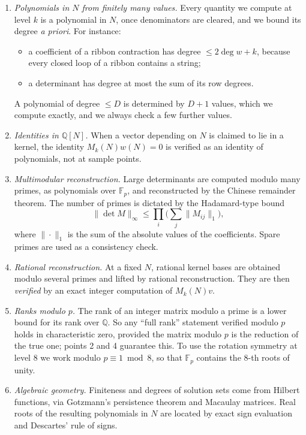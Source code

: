\documentclass[11pt]{amsart}
\theoremstyle{definition}
\theoremstyle{remark}
\theoremstyle{plain}
\numberwithin{equation}{section}
\numberwithin{table}{section}
\newcommand{\Q}{\mathbb Q}
\newcommand{\F}{\mathbb F}
\begin{document}
\begin{enumerate}
\item \emph{Polynomials in $N$ from finitely many values.} Every quantity we compute at level $k$ is a polynomial in $N$, once denominators are cleared, and we bound its degree \emph{a priori}. For instance:
\begin{itemize}
\item a coefficient of a ribbon contraction has degree $\le2\deg w+k$, because every closed loop of a ribbon contains a string;
\item a determinant has degree at most the sum of its row degrees.
\end{itemize}
A polynomial of degree $\le D$ is determined by $D+1$ values, which we compute exactly, and we always check a few further values.
\item \emph{Identities in $\Q[N]$.} When a vector depending on $N$ is claimed to lie in a kernel, the identity $M_k(N)w(N)=0$ is verified as an identity of polynomials, not at sample points.
\item \emph{Multimodular reconstruction.} Large determinants are computed modulo many primes, as polynomials over $\F_p$, and reconstructed by the Chinese remainder theorem. The number of primes is dictated by the Hadamard-type bound
\[
\|\det M\|_\infty\le\prod_i\Big(\sum_j\|M_{ij}\|_1\Big),
\]
where $\|\cdot\|_1$ is the sum of the absolute values of the coefficients. Spare primes are used as a consistency check.
\item \emph{Rational reconstruction.} At a fixed $N$, rational kernel bases are obtained modulo several primes and lifted by rational reconstruction. They are then \emph{verified} by an exact integer computation of $M_k(N)v$.
\item \emph{Ranks modulo $p$.} The rank of an integer matrix modulo a prime is a lower bound for its rank over $\Q$. So any ``full rank'' statement verified modulo $p$ holds in characteristic zero, provided the matrix modulo $p$ is the reduction of the true one; points 2 and 4 guarantee this. To use the rotation symmetry at level $8$ we work modulo $p\equiv1\bmod8$, so that $\F_p$ contains the $8$-th roots of unity.
\item \emph{Algebraic geometry.} Finiteness and degrees of solution sets come from Hilbert functions, via Gotzmann's persistence theorem and Macaulay matrices. Real roots of the resulting polynomials in $N$ are located by exact sign evaluation and Descartes' rule of signs.
\end{enumerate}
\end{document}
